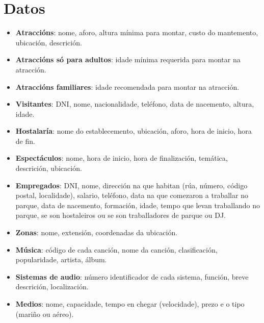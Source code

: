 \documentclass[12pt,a4paper]{book}
\theoremstyle{definition}
\theoremstyle{break}
\begin{document}
	\section{Datos}
	\begin{itemize}
		\item \textbf{Atraccións}: nome, aforo, altura mínima para montar, custo do mantemento, ubicación, descrición.
		
		\item \textbf{Atraccións só para adultos}: idade mínima requerida para montar na atracción.
		
		\item \textbf{Atraccións familiares}: idade recomendada para montar na atracción.
		
		\item \textbf{Visitantes}: DNI, nome, nacionalidade, teléfono, data de nacemento, altura, idade.
		
		\item \textbf{Hostalaría}: nome do establecemento, ubicación, aforo, hora de inicio, hora de fin.
		
		\item \textbf{Espectáculos}: nome, hora de inicio, hora de finalización, temática, descrición, ubicación.
		
		\item \textbf{Empregados}: DNI, nome, dirección na que habitan (rúa, número, código postal, localidade), salario, teléfono, data na que comezaron a traballar no parque, data de nacemento, formación, idade, tempo que levan traballando no parque, se son hostaleiros ou se son traballadores de parque ou DJ.
		
		\item \textbf{Zonas}: nome, extensión, coordenadas da ubicación.
		
		\item \textbf{Música}: código de cada canción, nome da canción, clasificación, popularidade, artista, álbum.
		
		\item \textbf{Sistemas de audio}: número identificador de cada sistema, función, breve
		descrición, localización.
		
		\item \textbf{Medios}: nome, capacidade, tempo en chegar (velocidade), prezo e o tipo (mariño ou aéreo).
	\end{itemize}
	
	
	
\end{document}
